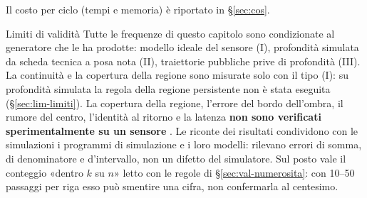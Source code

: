 Il costo per ciclo (tempi e memoria) è riportato in \S\ref{sec:cos}.
\begin{riquadro}{Limiti di validità}
Tutte le frequenze di questo capitolo sono condizionate al generatore che le ha prodotte: modello ideale del sensore (I), profondità simulata da scheda tecnica a posa nota (II), traiettorie pubbliche prive di profondità (III). La continuità e la copertura della regione sono misurate solo con il tipo (I): su profondità simulata la regola della regione persistente non è stata eseguita (\S\ref{sec:lim-limiti}). La copertura della regione, l'errore del bordo dell'ombra, il rumore del centro, l'identità al ritorno e la latenza \textbf{non sono verificati sperimentalmente su un sensore} . Le riconte dei risultati condividono con le simulazioni i programmi di simulazione e i loro modelli: rilevano errori di somma, di denominatore e d'intervallo, non un difetto del simulatore. Sul posto vale il conteggio «dentro $k$ su $n$» letto con le regole di \S\ref{sec:val-numerosita}: con 10–50 passaggi per riga esso può smentire una cifra, non confermarla al centesimo.
\end{riquadro}
